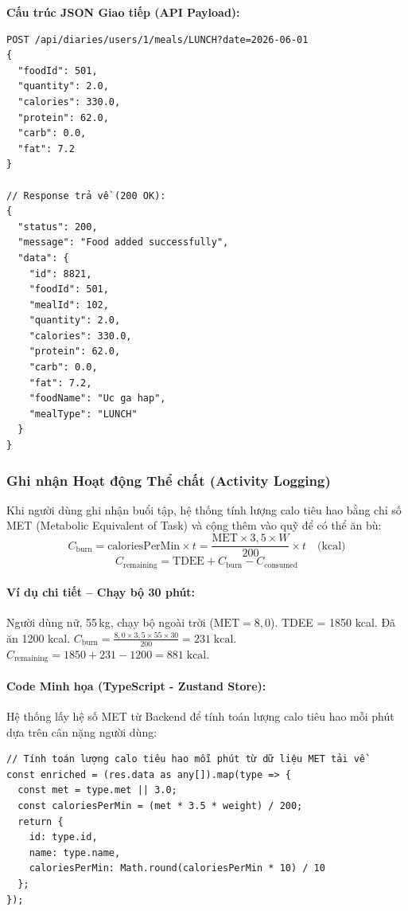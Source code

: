 \documentclass[12pt,a4paper]{article}
\begin{document}
\noindent\textbf{Cấu trúc JSON Giao tiếp (API Payload):}
\begin{verbatim}
POST /api/diaries/users/1/meals/LUNCH?date=2026-06-01
{
  "foodId": 501,
  "quantity": 2.0,
  "calories": 330.0,
  "protein": 62.0,
  "carb": 0.0,
  "fat": 7.2
}

// Response trả về (200 OK):
{
  "status": 200,
  "message": "Food added successfully",
  "data": {
    "id": 8821,
    "foodId": 501,
    "mealId": 102,
    "quantity": 2.0,
    "calories": 330.0,
    "protein": 62.0,
    "carb": 0.0,
    "fat": 7.2,
    "foodName": "Uc ga hap",
    "mealType": "LUNCH"
  }
}
\end{verbatim}

\subsubsection{Ghi nhận Hoạt động Thể chất (Activity Logging)}

Khi người dùng ghi nhận buổi tập, hệ thống tính lượng calo tiêu hao bằng chỉ số MET (Metabolic Equivalent of Task) và cộng thêm vào quỹ để có thể ăn bù:
\begin{equation}
    C_{\text{burn}} = \text{caloriesPerMin} \times t = \frac{\text{MET} \times 3{,}5 \times W}{200} \times t \quad \text{(kcal)}
\end{equation}
\begin{equation}
    C_{\text{remaining}} = \text{TDEE} + C_{\text{burn}} - C_{\text{consumed}}
\end{equation}

\paragraph{Ví dụ chi tiết -- Chạy bộ 30 phút:}
Người dùng nữ, 55\,kg, chạy bộ ngoài trời ($\text{MET} = 8{,}0$). TDEE = 1850 kcal. Đã ăn 1200 kcal.
$C_{\text{burn}} = \frac{8{,}0 \times 3{,}5 \times 55 \times 30}{200} = 231 \;\text{kcal}$.
$C_{\text{remaining}} = 1850 + 231 - 1200 = 881 \;\text{kcal}$.

\paragraph{Code Minh họa (TypeScript - Zustand Store):}
Hệ thống lấy hệ số MET từ Backend để tính toán lượng calo tiêu hao mỗi phút dựa trên cân nặng người dùng:
\begin{verbatim}
// Tính toán lượng calo tiêu hao mỗi phút từ dữ liệu MET tải về
const enriched = (res.data as any[]).map(type => {
  const met = type.met || 3.0;
  const caloriesPerMin = (met * 3.5 * weight) / 200;
  return {
    id: type.id,
    name: type.name,
    caloriesPerMin: Math.round(caloriesPerMin * 10) / 10
  };
});
\end{verbatim}
\end{document}
